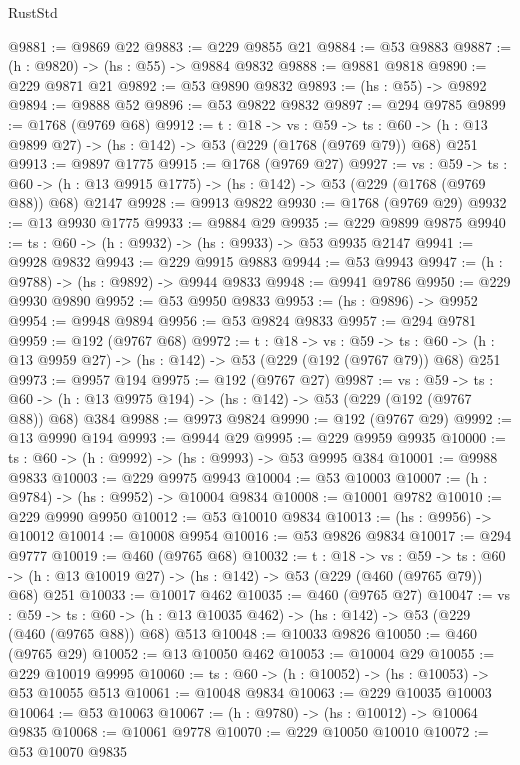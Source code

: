 \begin{lexlean}{RustStd}
\begin{coremodule}
@9881 := @9869 @22
@9883 := @229 @9855 @21
@9884 := @53 @9883
@9887 := (h : @9820) -> (hs : @55) -> @9884 @9832
@9888 := @9881 @9818
@9890 := @229 @9871 @21
@9892 := @53 @9890 @9832
@9893 := (hs : @55) -> @9892
@9894 := @9888 @52
@9896 := @53 @9822 @9832
@9897 := @294 @9785
@9899 := @1768 (@9769 @68)
@9912 := {t : @18} ->
  {vs : @59} ->
  {ts : @60} -> (h : @13 @9899 @27) -> (hs : @142) -> @53 (@229 (@1768 (@9769 @79)) @68) @251
@9913 := @9897 @1775
@9915 := @1768 (@9769 @27)
@9927 := {vs : @59} ->
  {ts : @60} -> (h : @13 @9915 @1775) -> (hs : @142) -> @53 (@229 (@1768 (@9769 @88)) @68) @2147
@9928 := @9913 @9822
@9930 := @1768 (@9769 @29)
@9932 := @13 @9930 @1775
@9933 := @9884 @29
@9935 := @229 @9899 @9875
@9940 := {ts : @60} -> (h : @9932) -> (hs : @9933) -> @53 @9935 @2147
@9941 := @9928 @9832
@9943 := @229 @9915 @9883
@9944 := @53 @9943
@9947 := (h : @9788) -> (hs : @9892) -> @9944 @9833
@9948 := @9941 @9786
@9950 := @229 @9930 @9890
@9952 := @53 @9950 @9833
@9953 := (hs : @9896) -> @9952
@9954 := @9948 @9894
@9956 := @53 @9824 @9833
@9957 := @294 @9781
@9959 := @192 (@9767 @68)
@9972 := {t : @18} ->
  {vs : @59} ->
  {ts : @60} -> (h : @13 @9959 @27) -> (hs : @142) -> @53 (@229 (@192 (@9767 @79)) @68) @251
@9973 := @9957 @194
@9975 := @192 (@9767 @27)
@9987 := {vs : @59} ->
  {ts : @60} -> (h : @13 @9975 @194) -> (hs : @142) -> @53 (@229 (@192 (@9767 @88)) @68) @384
@9988 := @9973 @9824
@9990 := @192 (@9767 @29)
@9992 := @13 @9990 @194
@9993 := @9944 @29
@9995 := @229 @9959 @9935
@10000 := {ts : @60} -> (h : @9992) -> (hs : @9993) -> @53 @9995 @384
@10001 := @9988 @9833
@10003 := @229 @9975 @9943
@10004 := @53 @10003
@10007 := (h : @9784) -> (hs : @9952) -> @10004 @9834
@10008 := @10001 @9782
@10010 := @229 @9990 @9950
@10012 := @53 @10010 @9834
@10013 := (hs : @9956) -> @10012
@10014 := @10008 @9954
@10016 := @53 @9826 @9834
@10017 := @294 @9777
@10019 := @460 (@9765 @68)
@10032 := {t : @18} ->
  {vs : @59} ->
  {ts : @60} -> (h : @13 @10019 @27) -> (hs : @142) -> @53 (@229 (@460 (@9765 @79)) @68) @251
@10033 := @10017 @462
@10035 := @460 (@9765 @27)
@10047 := {vs : @59} ->
  {ts : @60} -> (h : @13 @10035 @462) -> (hs : @142) -> @53 (@229 (@460 (@9765 @88)) @68) @513
@10048 := @10033 @9826
@10050 := @460 (@9765 @29)
@10052 := @13 @10050 @462
@10053 := @10004 @29
@10055 := @229 @10019 @9995
@10060 := {ts : @60} -> (h : @10052) -> (hs : @10053) -> @53 @10055 @513
@10061 := @10048 @9834
@10063 := @229 @10035 @10003
@10064 := @53 @10063
@10067 := (h : @9780) -> (hs : @10012) -> @10064 @9835
@10068 := @10061 @9778
@10070 := @229 @10050 @10010
@10072 := @53 @10070 @9835

\end{coremodule}
\end{lexlean}
